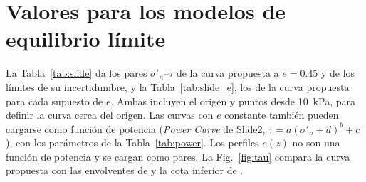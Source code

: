 \documentclass[11pt,letterpaper]{article}
\begin{document}
\section{Valores para los modelos de equilibrio límite}\label{sec:valores}
La Tabla~\ref{tab:slide} da los pares $\sigma'_n$--$\tau$ de la curva propuesta a $e = 0.45$ y de los límites de su incertidumbre, y la Tabla~\ref{tab:slide_e}, los de la curva propuesta para cada supuesto de $e$. Ambas incluyen el origen y puntos desde 10~kPa, para definir la curva cerca del origen. Las curvas con $e$ constante también pueden cargarse como función de potencia (\emph{Power Curve} de Slide2, $\tau = a(\sigma'_n + d)^b + c$), con los parámetros de la Tabla~\ref{tab:power}. Los perfiles $e(z)$ no son una función de potencia y se cargan como pares. La Fig.~\ref{fig:tau} compara la curva propuesta con las envolventes de \citet{leps} y la cota inferior de \citet{indraratna1993}.
\end{document}
